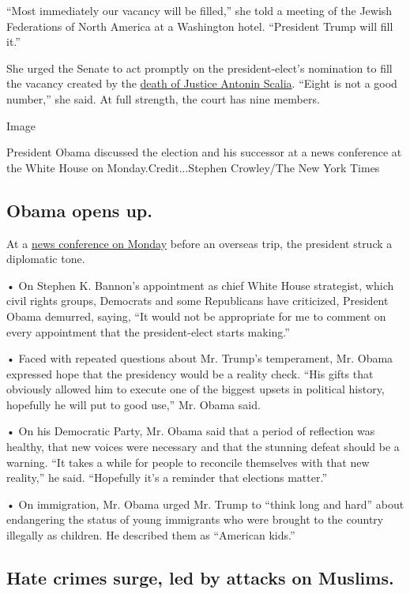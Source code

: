 ``Most immediately our vacancy will be filled,'' she told a meeting of
the Jewish Federations of North America at a Washington hotel.
``President Trump will fill it.''

She urged the Senate to act promptly on the president-elect's nomination
to fill the vacancy created by the
\href{http://www.nytimes.com/2016/02/14/us/antonin-scalia-death.html}{death
of Justice Antonin Scalia}. ``Eight is not a good number,'' she said. At
full strength, the court has nine members.

Image

President Obama discussed the election and his successor at a news
conference at the White House on Monday.Credit...Stephen Crowley/The New
York Times

\hypertarget{obama-opens-up}{%
\subsection{Obama opens up.}\label{obama-opens-up}}

At a
\href{http://www.nytimes.com/2016/11/14/us/politics/barack-obama-trump.html}{news
conference on Monday} before an overseas trip, the president struck a
diplomatic tone.

• On Stephen K. Bannon's appointment as chief White House strategist,
which civil rights groups, Democrats and some Republicans have
criticized, President Obama demurred, saying, ``It would not be
appropriate for me to comment on every appointment that the
president-elect starts making.''

• Faced with repeated questions about Mr. Trump's temperament, Mr. Obama
expressed hope that the presidency would be a reality check. ``His gifts
that obviously allowed him to execute one of the biggest upsets in
political history, hopefully he will put to good use,'' Mr. Obama said.

• On his Democratic Party, Mr. Obama said that a period of reflection
was healthy, that new voices were necessary and that the stunning defeat
should be a warning. ``It takes a while for people to reconcile
themselves with that new reality,'' he said. ``Hopefully it's a reminder
that elections matter.''

• On immigration, Mr. Obama urged Mr. Trump to ``think long and hard''
about endangering the status of young immigrants who were brought to the
country illegally as children. He described them as ``American kids.''

\hypertarget{hate-crimes-surge-led-by-attacks-on-muslims}{%
\subsection{Hate crimes surge, led by attacks on
Muslims.}\label{hate-crimes-surge-led-by-attacks-on-muslims}}

